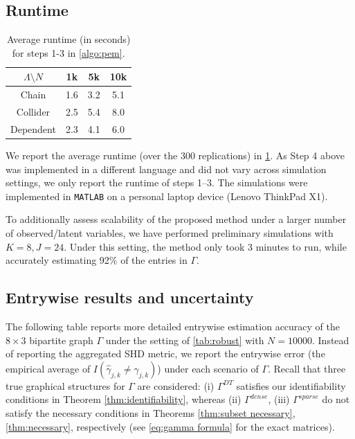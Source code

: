 \documentclass[10pt]{article} %
\def\hat{\widehat}
\begin{document}
\subsection{Runtime}
\begin{table}[h!]
    \centering
    \begin{tabular}{cccc}
    \toprule
        $\Lambda \setminus N$ & 1k & 5k & 10k \\
    \midrule
    Chain & 1.6 & 3.2 & 5.1 \\
    Collider & 2.5 & 5.4 & 8.0 \\
    Dependent & 2.3 & 4.1 & 6.0 \\
    \bottomrule
    \end{tabular}
    \vspace{0.2cm}
    \caption{Average runtime (in seconds) for steps 1-3 in \cref{algo:pem}.}
    \label{tab:runtime}
\end{table}

We report the average runtime (over the 300 replications) in \cref{tab:runtime}. As Step 4 above was implemented in a different language and did not vary across simulation settings, we only report the runtime of steps 1--3. The simulations were implemented in \texttt{MATLAB} on a personal laptop device (Lenovo ThinkPad X1). 

To additionally assess scalability of the proposed method under a larger number of observed/latent variables, we have performed preliminary simulations with $K=8,J=24$. Under this setting, the method only took 3 minutes to run, while accurately estimating 92\% of the entries in $\Gamma$.

\subsection{Entrywise results and uncertainty}
The following table reports more detailed entrywise estimation accuracy of the $8 \times 3$ bipartite graph $\Gamma$ under the setting of \cref{tab:robust} with $N = 10000$. Instead of reporting the aggregated SHD metric, we report the entrywise error (the empirical average of $I(\hat{\gamma}_{j,k} \neq \gamma_{j,k})$) under each scenario of $\Gamma$. Recall that three true graphical structures for $\Gamma$ are considered: (i) $\Gamma^{DT}$ satisfies our identifiability conditions in Theorem \ref{thm:identifiability}, whereas (ii) $\Gamma^{dense}$, (iii) $\Gamma^{sparse}$ do not satisfy the necessary conditions in Theorems \ref{thm:subset necessary}, \ref{thm:necessary}, respectively (see \eqref{eq:gamma formula} for the exact matrices).
\end{document}
